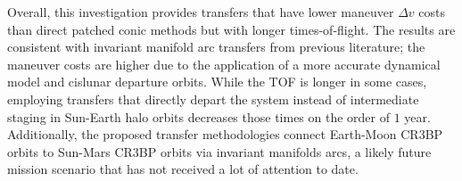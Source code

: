Overall, this investigation provides transfers that have lower maneuver $\Delta v$ costs than
direct patched conic methods but with longer times-of-flight. The results are consistent with
invariant manifold arc transfers from previous literature; the maneuver costs are higher due to the
application of a more accurate dynamical model and cislunar departure orbits. While the TOF is
longer in some cases, employing transfers that directly depart the system instead of intermediate
staging in Sun-Earth halo orbits decreases those times on the order of $1$ year. Additionally, the
proposed transfer methodologies connect Earth-Moon CR3BP orbits to Sun-Mars CR3BP orbits via
invariant manifolds arcs, a likely future mission scenario that has not received a lot of attention
to date.
